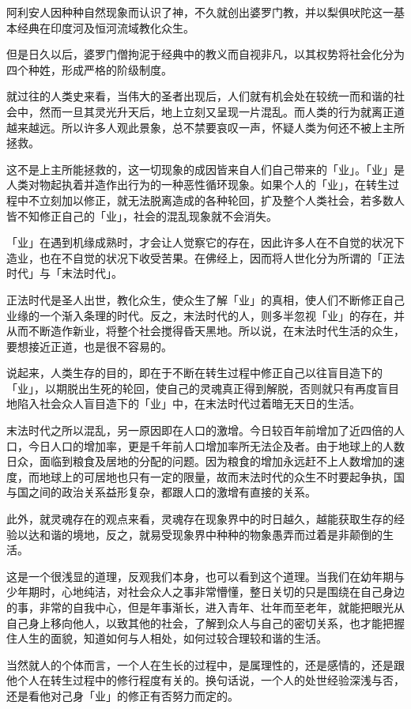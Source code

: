 \documentclass[twoside,openany]{book}
\begin{document}
阿利安人因种种自然现象而认识了神，不久就创出婆罗门教，并以梨俱吠陀这一基本经典在印度河及恒河流域教化众生。

但是日久以后，婆罗门僧拘泥于经典中的教义而自视非凡，以其权势将社会化分为四个种姓，形成严格的阶级制度。

就过往的人类史来看，当伟大的圣者出现后，人们就有机会处在较统一而和谐的社会中，然而一旦其灵光升天后，地上立刻又呈现一片混乱。而人类的行为就离正道越来越远。所以许多人观此景象，总不禁要哀叹一声，怀疑人类为何还不被上主所拯救。

这不是上主所能拯救的，这一切现象的成因皆来自人们自己带来的「业」。「业」是人类对物起执着并造作出行为的一种恶性循环现象。如果个人的「业」，在转生过程中不立刻加以修正，就无法脱离造成的各种轮回，扩及整个人类社会，若多数人皆不知修正自己的「业」，社会的混乱现象就不会消失。

「业」在遇到机缘成熟时，才会让人觉察它的存在，因此许多人在不自觉的状况下造业，也在不自觉的状况下收受苦果。在佛经上，因而将人世化分为所谓的「正法时代」与「末法时代」。

正法时代是圣人出世，教化众生，使众生了解「业」的真相，使人们不断修正自己业缘的一个渐入条理的时代。反之，末法时代的人，则多半忽视「业」的存在，并从而不断造作新业，将整个社会搅得昏天黑地。所以说，在末法时代生活的众生，要想接近正道，也是很不容易的。

说起来，人类生存的目的，即在于不断在转生过程中修正自己以往盲目造下的「业」，以期脱出生死的轮回，使自己的灵魂真正得到解脱，否则就只有再度盲目地陷入社会众人盲目造下的「业」中，在末法时代过着暗无天日的生活。

末法时代之所以混乱，另一原因即在人口的激增。今日较百年前增加了近四倍的人口，今日人口的增加率，更是千年前人口增加率所无法企及者。由于地球上的人数日众，面临到粮食及居地的分配的问题。因为粮食的增加永远赶不上人数增加的速度，而地球上的可居地也只有一定的限量，故而末法时代的众生不时要起争执，国与国之间的政治关系益形复杂，都跟人口的激增有直接的关系。

此外，就灵魂存在的观点来看，灵魂存在现象界中的时日越久，越能获取生存的经验以达和谐的境地，反之，就易受现象界中种种的物象愚弄而过着是非颠倒的生活。

这是一个很浅显的道理，反观我们本身，也可以看到这个道理。当我们在幼年期与少年期时，心地纯洁，对社会众人之事非常懵懂，整日关切的只是围绕在自己身边的事，非常的自我中心，但是年事渐长，进入青年、壮年而至老年，就能把眼光从自己身上移向他人，以致其他的社会，了解到众人与自己的密切关系，也才能把握住人生的面貌，知道如何与人相处，如何过较合理较和谐的生活。

当然就人的个体而言，一个人在生长的过程中，是属理性的，还是感情的，还是跟他个人在转生过程中的修行程度有关的。换句话说，一个人的处世经验深浅与否，还是看他对己身「业」的修正有否努力而定的。
\end{document}
